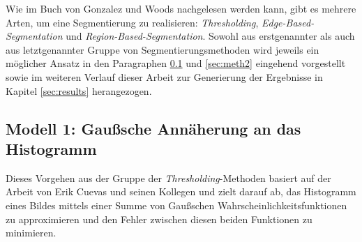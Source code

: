 		Wie im Buch \cite[Kapitel 10]{gonzalez-woods} von Gonzalez und Woods nachgelesen werden kann, gibt es mehrere Arten, um eine Segmentierung zu realisieren: \textit{Thresholding}, \textit{Edge-Based-Segmentation} und \textit{Region-Based-Segmentation}. Sowohl aus erstgenannter als auch aus letztgenannter Gruppe von Segmentierungsmethoden wird jeweils ein möglicher Ansatz in den Paragraphen \ref{sec:meth1} und \ref{sec:meth2} eingehend vorgestellt sowie im weiteren Verlauf dieser Arbeit zur Generierung der Ergebnisse in Kapitel \ref{sec:results} herangezogen. \\
		
	\subsection{Modell 1: Gaußsche Annäherung an das Histogramm}
	\label{sec:meth1}
		
		Dieses Vorgehen aus der Gruppe der \textit{Thresholding}-Methoden basiert auf der Arbeit von Erik Cuevas und seinen Kollegen \cite{cuevas-meth1} und zielt darauf ab, das Histogramm eines Bildes mittels einer Summe von Gaußschen Wahrscheinlichkeitsfunktionen zu approximieren und den Fehler zwischen diesen beiden Funktionen zu minimieren.
		
